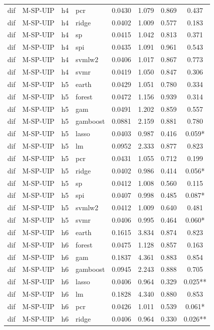 \begin{ThreePartTable}
\begin{longtable}[t]{llclcccc}
dif & M-SP-UIP & h4 & pcr & 0.0430 & 1.079 & 0.869 & 0.437\\
dif & M-SP-UIP & h4 & ridge & 0.0402 & 1.009 & 0.577 & 0.183\\
dif & M-SP-UIP & h4 & sp & 0.0415 & 1.042 & 0.813 & 0.371\\
dif & M-SP-UIP & h4 & spi & 0.0435 & 1.091 & 0.961 & 0.543\\
dif & M-SP-UIP & h4 & svmlw2 & 0.0406 & 1.017 & 0.867 & 0.773\\
dif & M-SP-UIP & h4 & svmr & 0.0419 & 1.050 & 0.847 & 0.306\\
\addlinespace
dif & M-SP-UIP & h5 & earth & 0.0429 & 1.051 & 0.780 & 0.334\\
dif & M-SP-UIP & h5 & forest & 0.0472 & 1.156 & 0.939 & 0.314\\
dif & M-SP-UIP & h5 & gam & 0.0491 & 1.202 & 0.859 & 0.557\\
dif & M-SP-UIP & h5 & gamboost & 0.0881 & 2.159 & 0.881 & 0.780\\
dif & M-SP-UIP & h5 & lasso & 0.0403 & 0.987 & 0.416 & 0.059*\\
dif & M-SP-UIP & h5 & lm & 0.0952 & 2.333 & 0.877 & 0.823\\
dif & M-SP-UIP & h5 & pcr & 0.0431 & 1.055 & 0.712 & 0.199\\
dif & M-SP-UIP & h5 & ridge & 0.0402 & 0.986 & 0.414 & 0.056*\\
dif & M-SP-UIP & h5 & sp & 0.0412 & 1.008 & 0.560 & 0.115\\
dif & M-SP-UIP & h5 & spi & 0.0407 & 0.998 & 0.485 & 0.087*\\
dif & M-SP-UIP & h5 & svmlw2 & 0.0412 & 1.009 & 0.640 & 0.481\\
dif & M-SP-UIP & h5 & svmr & 0.0406 & 0.995 & 0.464 & 0.060*\\
\addlinespace
dif & M-SP-UIP & h6 & earth & 0.1615 & 3.834 & 0.874 & 0.823\\
dif & M-SP-UIP & h6 & forest & 0.0475 & 1.128 & 0.857 & 0.163\\
dif & M-SP-UIP & h6 & gam & 0.1837 & 4.361 & 0.883 & 0.854\\
dif & M-SP-UIP & h6 & gamboost & 0.0945 & 2.243 & 0.888 & 0.705\\
dif & M-SP-UIP & h6 & lasso & 0.0406 & 0.964 & 0.329 & 0.025**\\
dif & M-SP-UIP & h6 & lm & 0.1828 & 4.340 & 0.880 & 0.853\\
dif & M-SP-UIP & h6 & pcr & 0.0426 & 1.011 & 0.539 & 0.061*\\
dif & M-SP-UIP & h6 & ridge & 0.0406 & 0.964 & 0.330 & 0.026**\\

\end{longtable}
\end{ThreePartTable}
